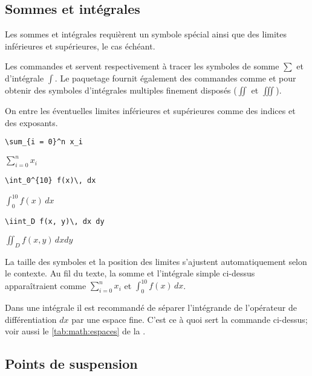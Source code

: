 \subsection{Sommes et intégrales}
\label{sec:math:bases:sommes-et-integrales}

Les sommes et intégrales requièrent un symbole spécial ainsi que des
limites inférieures et supérieures, le cas échéant.

Les commandes \cmd{\sum} et \cmd{\int} servent respectivement à tracer
les symboles de somme $\sum$ et d'intégrale $\int$. Le paquetage
 fournit également des commandes comme \cmd{\iint} et
\cmd{\iiint} pour obtenir des symboles d'intégrales multiples finement
disposés ($\iint$ et $\iiint$).

On entre les éventuelles limites inférieures et supérieures comme des
indices et des exposants.
\begin{demo}
  \begin{texample}
\begin{lstlisting}
\sum_{i = 0}^n x_i
\end{lstlisting}
    \producing $\displaystyle \sum_{i = 0}^n x_i$
  \end{texample}

  \begin{texample}
\begin{lstlisting}
\int_0^{10} f(x)\, dx
\end{lstlisting}
    \producing $\displaystyle \int_0^{10} f(x)\, dx$
  \end{texample}

  \begin{texample}
\begin{lstlisting}
\iint_D f(x, y)\, dx dy
\end{lstlisting}
    \producing $\displaystyle \iint_D f(x, y)\, dx dy$
  \end{texample}
\end{demo}

La taille des symboles et la position des limites s'ajustent
automatiquement selon le contexte. Au fil du texte, la somme et
l'intégrale simple ci-dessus apparaîtraient comme $\sum_{i = 0}^n x_i$
et $\int_0^{10} f(x)\, dx$.

Dans une intégrale il est recommandé de séparer l'intégrande de
l'opérateur de différentiation $dx$ par une espace fine. C'est ce à
quoi sert la commande \cmd{\,} ci-dessus; voir aussi le
\autoref{tab:math:espaces} de la .

\subsection{Points de suspension}
\label{sec:math:bases:dots}

